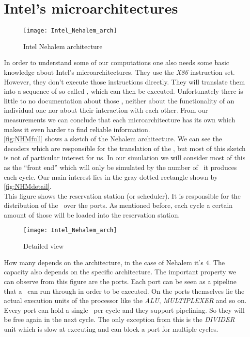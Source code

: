 \section{Intel's microarchitectures}


\begin{wrapfigure}[25]{l}{0.6\textwidth}
    \texttt{[image: Intel\_Nehalem\_arch]}
    \caption{Intel Nehalem architecture \cite{nehalem}}
    \label{fig:NHMfull}
\end{wrapfigure}


In order to understand some of our computations one also needs some basic knowledge about Intel's microarchitectures. They use the \emph{X86} instruction set. However, they don't execute those instructions directly. They will translate them into a sequence of so called \microops, which can then be executed. Unfortunately there is little to no documentation about those \microops, neither about the functionality of an individual one nor about their interaction with each other. From our measurements we can conclude that each microarchitecture has its own \microops which makes it even harder to find reliable information.\\ \autoref{fig:NHMfull} shows a sketch of the Nehalem architecture. We can see the decoders which are responsible for the translation of the \microops, but most of this sketch is not of particular interest for us. In our simulation we will consider most of this as the ``front end'' which will only be simulated by the number of \microops\ it produces each cycle. Our main interest lies in the gray dotted rectangle shown by \autoref{fig:NHMdetail}.\\
This figure shows the reservation station (or scheduler). It is responsible for the distribution of the \microops\ over the ports. As mentioned before, each cycle a certain amount of those will be loaded into the reservation station.


\begin{wrapfigure}[15]{r}{0.6\textwidth}
    \texttt{[image: Intel\_Nehalem\_arch]}
    \caption{Detailed view \cite{nehalem}}
    \label{fig:NHMdetail}
\end{wrapfigure}

 How many depends on the architecture, in the case of Nehalem it's $4$. The capacity also depends on the specific architecture. The important property we can observe from this figure are the ports. Each port can be seen as a pipeline that a \microop\ can run through in order to be executed. On the ports themselves lie the actual execution units of the processor like the \emph{ALU}, \emph{MULTIPLEXER} and so on. Every port can hold a single \microop\ per cycle and they support pipelining. So they will be free again in the next cycle. The only exception from this is the \emph{DIVIDER} unit which is slow at executing and can block a port for multiple cycles.


